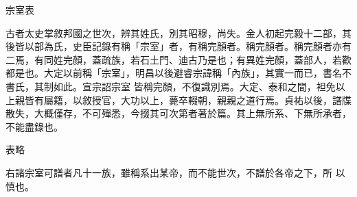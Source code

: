 
\begin{pinyinscope}

 宗室表



 古者太史掌敘邦國之世次，辨其姓氏，別其昭穆，尚失。金人初起完毅十二部，其後皆以部為氏，史臣記錄有稱「宗室」者，有稱完顏者。稱完顏者。稱完顏者亦有二焉，有同姓完顏，蓋疏族，若石土門、迪古乃是也；有異姓完顏，蓋部人，若歡都是也。大定以前稱「宗室」，明昌以後避睿宗諱稱「內族」，其實一而已，書名不書氏，其制如此。宣宗詔宗室
 皆稱完顏，不復識別焉。大定、泰和之間，袒免以上親皆有屬籍，以敘授官，大功以上，薨卒輟朝，親親之道行焉。貞祐以後，譜牒散失，大概僅存，不可殫悉，今掇其可次第者著於篇。其上無所系、下無所承者，不能盡錄也。



 表略



 右諸宗室可譜者凡十一族，雖稱系出某帝，而不能世次，不譜於各帝之下，所
 以慎也。



\end{pinyinscope}